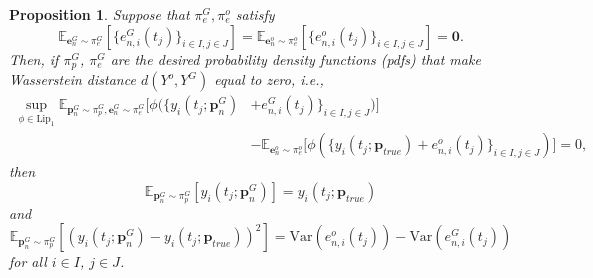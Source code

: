 \documentclass[10pt,a4paper]{amsart}
\newtheorem{proposition}{Proposition}
\begin{document}
\begin{proposition}\label{gan2} Suppose that $\pi_{e}^{G},\pi_{e}^{o}$ satisfy \[ \mathbb{E}_{\mathbf{e}_{n}^{G} \sim \pi_{e}^{G}}[\{e_{n,i}^{G}(t_{j})\}_{i\in I, j \in J}] = \mathbb{E}_{\mathbf{e}_{n}^{o} \sim \pi_{e}^{o}}[\{e_{n,i}^{o}(t_{j})\}_{i\in I, j \in J}] = \mathbf{0}.\] Then, if $\pi_{p}^{G}$, $\pi_{e}^{G}$ are the desired probability density functions (pdfs) that make Wasserstein distance $d(Y^{o},Y^{G})$ equal to zero, i.e.,
\begin{align*}
\sup_{\phi \in \mathrm{Lip}_{1}}\mathbb{E}_{\mathbf{p}_{n}^{G} \sim \pi_{p}^{G}, \mathbf{e}_{n}^{G} \sim \pi_{e}^{G}}\bigg[\phi (\{y_{i}(t_{j};\mathbf{p}_{n}^{G})&+e_{n,i}^{G}(t_{j})\}_{i\in I,j\in J})\bigg]\\
& - \mathbb{E}_{\mathbf{e}_{n}^{o} \sim \pi_{e}^{o}}\bigg[\phi (\{y_{i}(t_{j};\mathbf{p}_{true})+e_{n,i}^{o}(t_{j})\}_{i\in I,j\in J}) \bigg] = 0,
\end{align*}
 then \[\mathbb{E}_{\mathbf{p}_{n}^{G} \sim \pi_{p}^{G}}[y_{i}(t_{j};\mathbf{p}_{n}^{G})] = y_{i}(t_{j};\mathbf{p}_{true})\] and \[ \mathbb{E}_{\mathbf{p}_{n}^{G} \sim \pi_{p}^{G}}[(y_{i}(t_{j};\mathbf{p}_{n}^{G})-y_{i}(t_{j};\mathbf{p}_{true}))^{2}] = \text{Var}(e_{n,i}^{o}(t_{j}))-\text{Var}(e_{n,i}^{G}(t_{j}))\] for all $i \in I$, $j \in J$.
\end{proposition}
\end{document}
